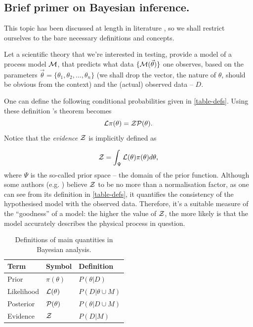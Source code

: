 \documentclass[usenatbib]{mnras}
\begin{document}
\subsection{Brief primer on Bayesian inference.}
\label{sec:org54b4e85}

This topic has been discussed at length in literature
\citep{jeffreys2010scientific}, so we shall restrict ourselves to the
bare necessary definitions and concepts.

Let a scientific theory that we're interested in testing, provide a
model of a process model \({\cal M}\), that predicts what data \(\lbrace {\cal M}(\vec{\theta})\rbrace\) one observes, based on the
parameters \(\vec{\theta} = \lbrace \theta_1, \theta_2, \ldots,
   \theta_n \rbrace\) (we shall drop the vector, the nature of
\(\theta\), should be obvious from the context) and the (actual)
observed data -- \(D\).

One can define the following conditional probabilities given
in \autoref{table-defs}. Using these definition \citeauthor{1763} 's theorem
becomes
\begin{equation}
 {\cal L} \pi (\theta) = {\cal Z} {\cal P} (\theta).
\label{eq:bayes} 
\end{equation}
Notice that the \emph{evidence} \({\cal Z}\) is implicitly defined as

\begin{equation}\label{eq:def-z}
 {\cal Z} = \int_{\Psi} {\cal L}(\theta) \pi(\theta) d\theta, 
\end{equation}
where \(\Psi\) is the so-called prior space -- the domain of the
prior function. Although some authors
(e.g. \citeauthor{jeffreys2010scientific}) believe \({\cal Z}\) to be
no more than a normalisation factor, as one can see from its
definition in \autoref{table-defs}, it quantifies the consistency of
the hypothesised model with the observed data. Therefore, it's a
suitable measure of the ``goodness'' of a model: the higher the
value of \({\cal Z}\), the more likely is that the model accurately
describes the physical process in question.

\begin{table}[htbp]
\caption{Definitions of main quantities in Bayesian analysis. \label{table-defs}}
\centering
\begin{tabular}{lll}
\textbf{\textbf{Term}} & \textbf{\textbf{Symbol}} & \textbf{\textbf{Definition}}\\
\hline
Prior & \(\pi(\theta)\) & \(P ( \theta  \vert D)\)\\
Likelihood & \({\cal L}(\theta)\) & \(P ( D \vert \theta \cup M)\)\\
Posterior & \({\cal P}(\theta)\) & \(P ( \theta \vert D \cup M)\)\\
Evidence & \({\cal Z}\) & \(P ( D \vert M)\)\\
\end{tabular}
\end{table}
\end{document}
